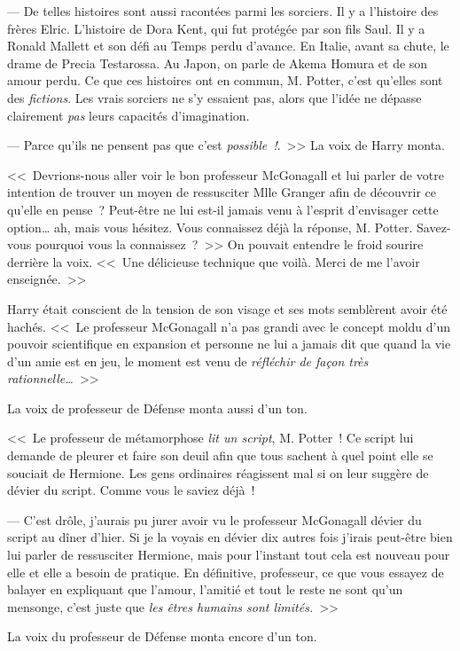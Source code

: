 --- De telles histoires sont aussi racontées parmi les sorciers. Il y a l'histoire des frères Elric. L'histoire de Dora Kent, qui fut protégée par son fils Saul. Il y a Ronald Mallett et son défi au Temps perdu d'avance. En Italie, avant sa chute, le drame de Precia Testarossa. Au Japon, on parle de Akema Homura et de son amour perdu. Ce que ces histoires ont en commun, M. Potter, c'est qu'elles sont des \emph{fictions}. Les vrais sorciers ne s'y essaient pas, alors que l'idée ne dépasse clairement \emph{pas} leurs capacités d'imagination.

--- Parce qu'ils ne pensent pas que c'est \emph{possible~!}.~>> La voix de Harry monta.

<<~Devrions-nous aller voir le bon professeur McGonagall et lui parler de votre intention de trouver un moyen de ressusciter Mlle Granger afin de découvrir ce qu'elle en pense~? Peut-être ne lui est-il jamais venu à l'esprit d'envisager cette option… ah, mais vous hésitez. Vous connaissez déjà la réponse, M. Potter. Savez-vous pourquoi vous la connaissez~?~>> On pouvait entendre le froid sourire derrière la voix. <<~Une délicieuse technique que voilà. Merci de me l'avoir enseignée.~>>

Harry était conscient de la tension de son visage et ses mots semblèrent avoir été hachés. <<~Le professeur McGonagall n'a pas grandi avec le concept moldu d'un pouvoir scientifique en expansion et personne ne lui a jamais dit que quand la vie d'un amie est en jeu, le moment est venu de \emph{réfléchir de façon très rationnelle…}~>>

La voix de professeur de Défense monta aussi d'un ton.

<<~Le professeur de métamorphose \emph{lit un script}, M. Potter~! Ce script lui demande de pleurer et faire son deuil afin que tous sachent à quel point elle se souciait de Hermione. Les gens ordinaires réagissent mal si on leur suggère de dévier du script. Comme vous le saviez déjà~!

--- C'est drôle, j'aurais pu jurer avoir vu le professeur McGonagall dévier du script au dîner d'hier. Si je la voyais en dévier dix autres fois j'irais peut-être bien lui parler de ressusciter Hermione, mais pour l'instant tout cela est nouveau pour elle et elle a besoin de pratique. En définitive, professeur, ce que vous essayez de balayer en expliquant que l'amour, l'amitié et tout le reste ne sont qu'un mensonge, c'est juste que \emph{les êtres humains sont limités.}~>>

La voix du professeur de Défense monta encore d'un ton.

